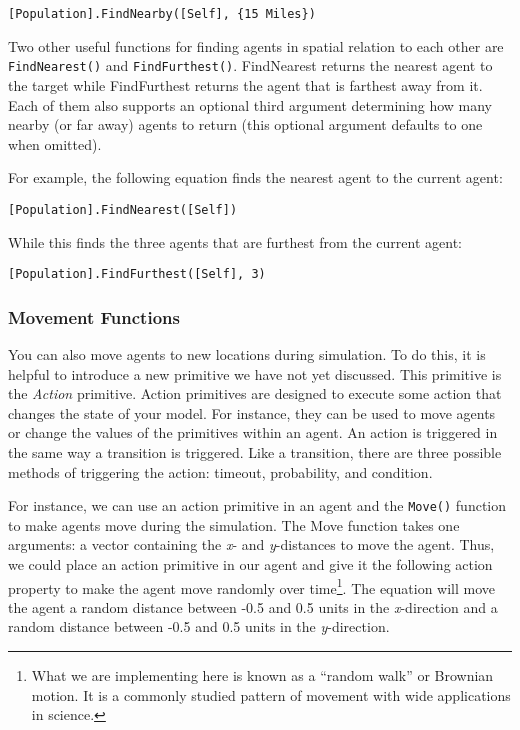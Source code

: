 \documentclass[]{memoir}
\begin{document}
\lstinline![Population].FindNearby([Self], {15 Miles})!

Two other useful functions for finding agents in spatial relation to
each other are \lstinline!FindNearest()! and \lstinline!FindFurthest()!.
FindNearest returns the nearest agent to the target while FindFurthest
returns the agent that is farthest away from it. Each of them also
supports an optional third argument determining how many nearby (or far
away) agents to return (this optional argument defaults to one when
omitted).

For example, the following equation finds the nearest agent to the
current agent:

\lstinline![Population].FindNearest([Self])!

While this finds the three agents that are furthest from the current
agent:

\lstinline![Population].FindFurthest([Self], 3)!

\subsubsection{Movement Functions}

You can also move agents to new locations during simulation. To do this,
it is helpful to introduce a new primitive we have not yet discussed.
This primitive is the \emph{Action} primitive. Action primitives are
designed to execute some action that changes the state of your model.
For instance, they can be used to move agents or change the values of
the primitives within an agent. An action is triggered in the same way a
transition is triggered. Like a transition, there are three possible
methods of triggering the action: timeout, probability, and condition.

For instance, we can use an action primitive in an agent and the
\lstinline!Move()! function to make agents move during the simulation.
The Move function takes one arguments: a vector containing the \emph{x}-
and \emph{y}-distances to move the agent. Thus, we could place an action
primitive in our agent and give it the following action property to make
the agent move randomly over time\footnote{What we are implementing here
  is known as a ``random walk'' or Brownian motion. It is a commonly
  studied pattern of movement with wide applications in science.}. The
equation will move the agent a random distance between -0.5 and 0.5
units in the \emph{x}-direction and a random distance between -0.5 and
0.5 units in the \emph{y}-direction.
\end{document}
